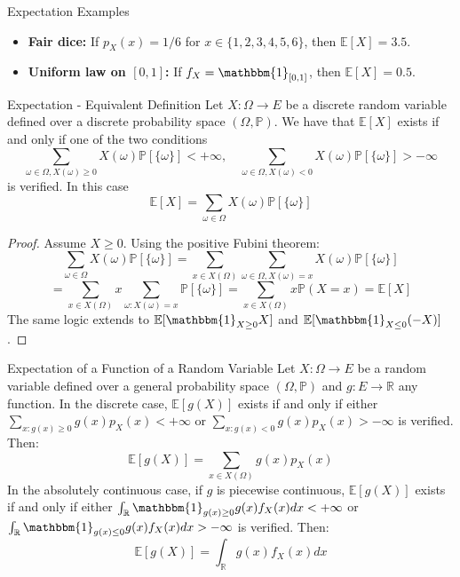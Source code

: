 \documentclass[11pt, a4paper]{article}
\begin{document}
\begin{example}{Expectation Examples}{}
\begin{itemize}
    \item \textbf{Fair dice:} If $p_X(x) = 1/6$ for $x \in \{1, 2, 3, 4, 5, 6\}$, then $\mathbb{E}[X] = 3.5$.
    \item \textbf{Uniform law on $[0, 1]$:} If $f_X = \mathbbm{1}_{[0,1]}$, then $\mathbb{E}[X] = 0.5$.
\end{itemize}
\end{example}

\begin{proposition}{Expectation - Equivalent Definition}{}
Let $X: \Omega \to E$ be a discrete random variable defined over a discrete probability space $(\Omega, \mathbb{P})$. We have that $\mathbb{E}[X]$ exists if and only if one of the two conditions
\[ \sum_{\omega \in \Omega, X(\omega) \ge 0} X(\omega) \mathbb{P}[\{\omega\}] < +\infty, \quad \sum_{\omega \in \Omega, X(\omega) < 0} X(\omega) \mathbb{P}[\{\omega\}] > -\infty \]
is verified. In this case
\[ \mathbb{E}[X] = \sum_{\omega \in \Omega} X(\omega) \mathbb{P}[\{\omega\}] \]
\end{proposition}

\begin{proof}
Assume $X \ge 0$. Using the positive Fubini theorem:
\[ \sum_{\omega \in \Omega} X(\omega) \mathbb{P}[\{\omega\}] = \sum_{x \in X(\Omega)} \sum_{\omega \in \Omega, X(\omega)=x} X(\omega) \mathbb{P}[\{\omega\}] \]
\[ = \sum_{x \in X(\Omega)} x \sum_{\omega: X(\omega)=x} \mathbb{P}[\{\omega\}] = \sum_{x \in X(\Omega)} x \mathbb{P}(X=x) = \mathbb{E}[X] \]
The same logic extends to $\mathbb{E}[\mathbbm{1}_{X \ge 0}X]$ and $\mathbb{E}[\mathbbm{1}_{X \le 0}(-X)]$.
\end{proof}

\begin{proposition}{Expectation of a Function of a Random Variable}{}
Let $X: \Omega \to E$ be a random variable defined over a general probability space $(\Omega, \mathbb{P})$ and $g: E \to \mathbb{R}$ any function. 
In the discrete case, $\mathbb{E}[g(X)]$ exists if and only if either $\sum_{x: g(x) \ge 0} g(x) p_X(x) < +\infty$ or $\sum_{x: g(x) < 0} g(x) p_X(x) > -\infty$ is verified. Then:
\[ \mathbb{E}[g(X)] = \sum_{x \in X(\Omega)} g(x) p_X(x) \]
In the absolutely continuous case, if $g$ is piecewise continuous, $\mathbb{E}[g(X)]$ exists if and only if either $\int_{\mathbb{R}} \mathbbm{1}_{g(x) \ge 0} g(x) f_X(x) dx < +\infty$ or $\int_{\mathbb{R}} \mathbbm{1}_{g(x) \le 0} g(x) f_X(x) dx > -\infty$ is verified. Then:
\[ \mathbb{E}[g(X)] = \int_{\mathbb{R}} g(x) f_X(x) dx \]
\end{proposition}
\end{document}
